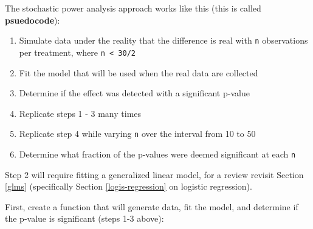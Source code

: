 \documentclass[]{book}
\providecommand{\tightlist}{%
  \setlength{\itemsep}{0pt}\setlength{\parskip}{0pt}}
\theoremstyle{definition}
\theoremstyle{definition}
\theoremstyle{definition}
\theoremstyle{remark}
\begin{document}
The stochastic power analysis approach works like this (this is called
\textbf{psuedocode}):

\begin{enumerate}
\def\labelenumi{\arabic{enumi}.}
\tightlist
\item
  Simulate data under the reality that the difference is real with
  \texttt{n} observations per treatment, where
  \texttt{n\ \textless{}\ 30/2}
\item
  Fit the model that will be used when the real data are collected
\item
  Determine if the effect was detected with a significant p-value
\item
  Replicate steps 1 - 3 many times
\item
  Replicate step 4 while varying \texttt{n} over the interval from 10 to
  50
\item
  Determine what fraction of the p-values were deemed significant at
  each \texttt{n}
\end{enumerate}

Step 2 will require fitting a generalized linear model, for a review
revisit Section \ref{glms} (specifically Section \ref{logis-regression}
on logistic regression).

First, create a function that will generate data, fit the model, and
determine if the p-value is significant (steps 1-3 above):
\end{document}
